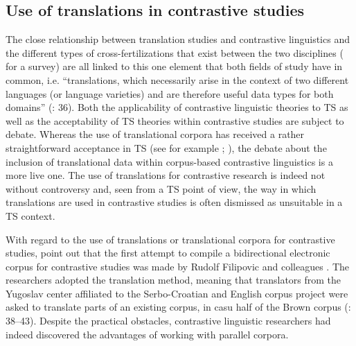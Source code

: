 \subsection{\label{sec:2.3.1}  Use of translations in contrastive studies}

The close relationship between translation studies and contrastive linguistics and the different types of cross-fertilizations that exist between the two disciplines  (\citealt{gambier_contrastive_2013} for a survey) are all linked to this one element that both fields of study have in common, i.e. “translations, which necessarily arise in the context of two different languages (or language varieties) and are therefore useful data types for both domains” (\citealt{gambier_contrastive_2013}: 36). Both the applicability of contrastive linguistic theories to TS as well as the acceptability of TS theories within contrastive studies are subject to debate. Whereas the use of translational corpora has received a rather straightforward acceptance in TS (see for example \citealt{wollin_translationese_1986, aijmer_translations_1996}; \citealt{laviosa_corpus-based_2002}), the debate about the inclusion of translational data within corpus-based contrastive linguistics is a more live one. The use of translations for contrastive research is indeed not without controversy and, seen from a TS point of view, the way in which translations are used in contrastive studies is often dismissed as unsuitable in a TS context.



With regard to the use of translations or translational corpora for contrastive studies, \citet[40]{altenberg_recent_2002} point out that the first attempt to compile a bidirectional electronic corpus for contrastive studies was made by Rudolf Filipovic and colleagues \citep{filipovic_choice_1969}. The researchers adopted the translation method, meaning that translators from the Yugoslav center affiliated to the Serbo-Croatian and English corpus project were asked to translate parts of an existing corpus, in casu half of the Brown corpus (\citealt{filipovic_choice_1969}: 38–43). Despite the practical obstacles, contrastive linguistic researchers had indeed discovered the advantages of working with parallel corpora.


